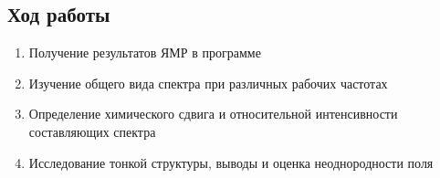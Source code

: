 \subsection{Ход работы}
\begin{enumerate}
	\item Получение результатов ЯМР в программе
	\item Изучение общего вида спектра при различных рабочих частотах
	\item Определение химического сдвига и относительной интенсивности составляющих спектра
	\item Исследование тонкой структуры, выводы и оценка неоднородности поля 
\end{enumerate}
